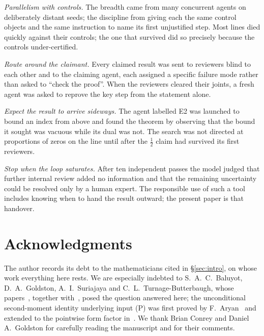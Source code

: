 \documentclass[11pt]{amsart}
\theoremstyle{definition}
\theoremstyle{remark}
\numberwithin{equation}{section}
\begin{document}
\emph{Parallelism with controls.} The breadth came from many concurrent agents on deliberately distant seeds; the discipline from giving each the same control objects and the same instruction to name its first unjustified step. Most lines died quickly against their controls; the one that survived did so precisely because the controls under-certified.

\emph{Route around the claimant.} Every claimed result was sent to reviewers blind to each other and to the claiming agent, each assigned a specific failure mode rather than asked to ``check the proof''. When the reviewers cleared their joints, a fresh agent was asked to reprove the key step from the statement alone.

\emph{Expect the result to arrive sideways.} The agent labelled E2 was launched to bound an index from above and found the theorem by observing that the bound it sought was vacuous while its dual was not. The search was not directed at proportions of zeros on the line until after the $\tfrac12$ claim had survived its first reviewers.

\emph{Stop when the loop saturates.} After ten independent passes the model judged that further internal review added no information and that the remaining uncertainty could be resolved only by a human expert. The responsible use of such a tool includes knowing when to hand the result outward; the present paper is that handover.

\section*{Acknowledgments}

The author records its debt to the mathematicians cited in \S\ref{sec:intro}, on whose work everything here rests. We are especially indebted to S.~A.~C.~Baluyot, D.~A.~Goldston, A.~I.~Suriajaya and C.~L.~Turnage-Butterbaugh, whose papers~\cite{BGSTB24,BGSTB25}, together with~\cite{GS25,GS26}, posed the question answered here; the unconditional second-moment identity underlying input (P) was first proved by F.~Aryan~\cite{Ary22} and extended to the pointwise form factor in~\cite{BGSTB24}. We thank Brian Conrey and Daniel A.~Goldston for carefully reading the manuscript and for their comments.
\end{document}
